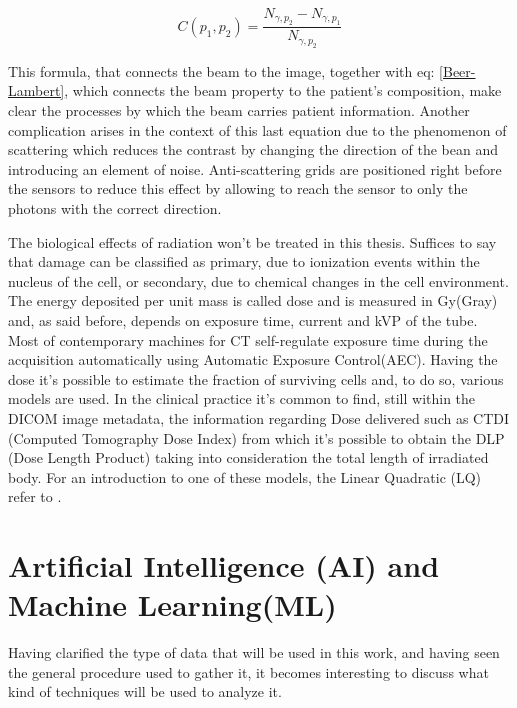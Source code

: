 \begin{equation}
C(p_1,p_2) = \frac{N_{\gamma ,p_2}-N_{\gamma ,p_1}}{N_{\gamma ,p_2}}
\end{equation}

This formula, that connects the beam to the image, together with eq: \ref{Beer-Lambert}, which connects the beam property to the patient's composition, make clear the processes by which the beam carries patient information. Another complication arises in the context of this last equation due to the phenomenon of scattering which reduces the contrast by changing the direction of the bean and introducing an element of noise. Anti-scattering grids are positioned right before the sensors to reduce this effect by allowing to reach the sensor to only the photons with the correct direction.

The biological effects of radiation won't be treated in this thesis. Suffices to say that damage can be classified as primary, due to ionization events within the nucleus of the cell, or secondary, due to chemical changes in the cell environment. The energy deposited per unit mass is called dose and is measured in Gy(Gray) and, as said before, depends on exposure time, current and kVP of the tube. Most of contemporary machines for CT self-regulate exposure time during the acquisition automatically using Automatic Exposure Control(AEC). Having the dose it's possible to estimate the fraction of surviving cells and, to do so, various models are used. In the clinical practice it's common to find, still within the DICOM image metadata, the information regarding Dose delivered such as CTDI (Computed Tomography Dose Index) from which it's possible to obtain the DLP (Dose Length Product) taking into consideration the total length of irradiated body. For an introduction to one of these models, the Linear Quadratic (LQ) refer to \cite{LQ_model}.\newline

\section{Artificial Intelligence (AI) and Machine Learning(ML)}
Having clarified the type of data that will be used in this work, and having seen the general procedure used to gather it, it becomes interesting to discuss what kind of techniques will be used to analyze it.

